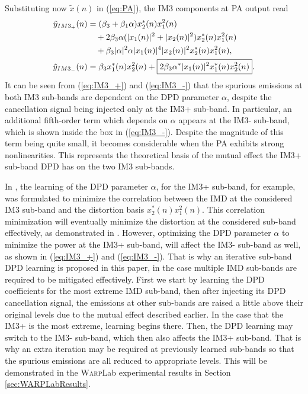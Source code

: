 Substituting now $\tilde{x}(n)$ in (\ref{eq:PA}), the IM3 components at PA output read
\begin{align}
\small
\tilde{y}_{IM3_+}(n) &= (\beta_3 + \beta_1 \alpha) x_2^*(n) x_1^2(n) \nonumber\\
& \quad + 2 \beta_3 \alpha (|x_1(n)|^2 + |x_2(n)|^2) x_2^*(n) x_1^2(n) \nonumber\\ 
& \quad + \beta_3 |\alpha|^2 \alpha |x_1(n)|^4 |x_2(n)|^2 x_2^*(n) x_1^2(n), \label{eq:IM3_+}\\
\tilde{y}_{IM3_-}(n) &=  \beta_3 x_1^*(n) x_2^2(n) + \boxed{2 \beta_3 \alpha^* |x_1(n)|^2 x_1^*(n) x_2^2(n)}. \label{eq:IM3_-}
\end{align}
\normalsize
It can be seen from (\ref{eq:IM3_+}) and (\ref{eq:IM3_-}) that the spurious emissions at both IM3 sub-bands are dependent on the DPD parameter $\alpha$, despite the cancellation signal being injected only at the IM3+ sub-band. 
In particular, an additional fifth-order term which depends on $\alpha$ appears at the IM3- sub-band, which is shown inside the box in (\ref{eq:IM3_-}). 
Despite the magnitude of this term being quite small, it becomes considerable when the PA exhibits strong nonlinearities. 
This represents the theoretical basis of the mutual effect the IM3+ sub-band DPD has on the two IM3 sub-bands. 

In \cite{ICASSP2014}, the learning of the DPD parameter $\alpha$, for the IM3+ sub-band, for example, was formulated to minimize the correlation between the IMD at the considered IM3 sub-band and the distortion basis $x_2^*(n)x_1^2(n)$. 
This correlation minimization will eventually minimize the distortion at the considered sub-band effectively, as demonstrated in \cite{ICASSP2014,Asilomar2015}. 
However, optimizing the DPD parameter $\alpha$ to minimize the power at the IM3+ sub-band, will affect the IM3- sub-band as well, as shown in (\ref{eq:IM3_+}) and (\ref{eq:IM3_-}). 
That is why an iterative sub-band DPD learning is proposed in this paper, in the case multiple IMD sub-bands are required to be mitigated effectively. 
First we start by learning the DPD coefficients for the most extreme IMD sub-band, then after injecting its DPD cancellation signal, the emissions at other sub-bands are raised a little above their original levels due to the mutual effect described earlier. 
In the case that the IM3+ is the most extreme, learning begins there. Then, the DPD learning may switch to the IM3- sub-band, which then also affects the IM3+ sub-band. 
That is why an extra iteration may be required at previously learned sub-bands so that the spurious emissions are all reduced to appropriate levels. This will be demonstrated in the \textsc{Warp}Lab experimental results in Section \ref{sec:WARPLabResults}.

